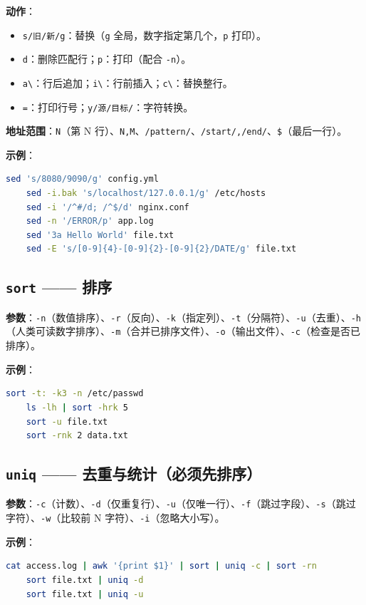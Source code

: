 \textbf{动作}：
\begin{itemize}
\item \texttt{s/旧/新/g}：替换（\texttt{g} 全局，数字指定第几个，\texttt{p} 打印）。
\item \texttt{d}：删除匹配行；\texttt{p}：打印（配合 \texttt{-n}）。
\item \texttt{a\textbackslash}：行后追加；\texttt{i\textbackslash}：行前插入；\texttt{c\textbackslash}：替换整行。
\item \texttt{=}：打印行号；\texttt{y/源/目标/}：字符转换。
\end{itemize}

\textbf{地址范围}：\texttt{N}（第 N 行）、\texttt{N,M}、\texttt{/pattern/}、\texttt{/start/,/end/}、\texttt{\$}（最后一行）。

\textbf{示例}：
\begin{lstlisting}[language=bash]
	sed 's/8080/9090/g' config.yml
	sed -i.bak 's/localhost/127.0.0.1/g' /etc/hosts
	sed -i '/^#/d; /^$/d' nginx.conf
	sed -n '/ERROR/p' app.log
	sed '3a Hello World' file.txt
	sed -E 's/[0-9]{4}-[0-9]{2}-[0-9]{2}/DATE/g' file.txt
\end{lstlisting}

\subsection{\texttt{sort} —— 排序} \textbf{参数}：\texttt{-n}（数值排序）、\texttt{-r}（反向）、\texttt{-k}（指定列）、\texttt{-t}（分隔符）、\texttt{-u}（去重）、\texttt{-h}（人类可读数字排序）、\texttt{-m}（合并已排序文件）、\texttt{-o}（输出文件）、\texttt{-c}（检查是否已排序）。

\textbf{示例}：
\begin{lstlisting}[language=bash]
	sort -t: -k3 -n /etc/passwd
	ls -lh | sort -hrk 5
	sort -u file.txt
	sort -rnk 2 data.txt
\end{lstlisting}

\subsection{\texttt{uniq} —— 去重与统计（必须先排序）} \textbf{参数}：\texttt{-c}（计数）、\texttt{-d}（仅重复行）、\texttt{-u}（仅唯一行）、\texttt{-f}（跳过字段）、\texttt{-s}（跳过字符）、\texttt{-w}（比较前 N 字符）、\texttt{-i}（忽略大小写）。

\textbf{示例}：
\begin{lstlisting}[language=bash]
	cat access.log | awk '{print $1}' | sort | uniq -c | sort -rn
	sort file.txt | uniq -d
	sort file.txt | uniq -u
\end{lstlisting}

